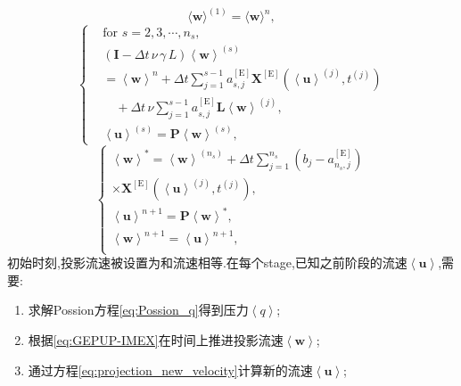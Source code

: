 \documentclass[12pt,halfline,a4paper]{ouparticle}
\begin{document}
\begin{equation}
    \langle\boldsymbol{w} \rangle^{\left( 1 \right)}=\langle\boldsymbol{w} \rangle^{n},   
\end{equation}
\begin{equation}\label{eq:GEPUP-IMEX}
\left\{
\begin{aligned}
    & \text{for } s = 2, 3, \cdots, n_s, \\
    & \left( \boldsymbol{I} - \Delta t \, \nu \, \gamma \, L \right) \left< \boldsymbol{w} \right>^{(s)} \\
    & = \left< \boldsymbol{w} \right>^{n} + \Delta t \sum_{j=1}^{s-1} a_{s,j}^{\left[ \mathrm{E} \right]} \boldsymbol{X}^{\left[ \mathrm{E} \right]} \left( \left< \boldsymbol{u} \right>^{(j)}, t^{(j)} \right) \\
    & \quad + \Delta t \, \nu \sum_{j=1}^{s-1} a_{s,j}^{\left[ \mathrm{E} \right]} \boldsymbol{L} \left< \boldsymbol{w} \right>^{(j)}, \\
    & \left< \boldsymbol{u} \right>^{(s)} = \boldsymbol{P} \left< \boldsymbol{w} \right>^{(s)},
\end{aligned}
\right.
\end{equation}
\begin{equation}
\left\{\begin{array} {l} {{{\left< \boldsymbol{w} \right>^{*}=\left< \boldsymbol{w} \right>^{\left( n_{s} \right)}+\Delta t \sum_{j=1}^{n_{s}} \left( b_{j}-a_{n_{s}, j}^{\left[ \mathrm{E} \right]} \right)}}} \\ {{{\times\boldsymbol{X}^{\left[ \mathrm{E} \right]} \left( \left< \boldsymbol{u} \right>^{\left( j \right)}, t^{\left( j \right)} \right),}}} \\ {{{\left< \boldsymbol{u} \right>^{n+1}=\boldsymbol{P} \left< \boldsymbol{w} \right>^{*},}}} \\ {{{\left< \boldsymbol{w} \right>^{n+1}=\left< \boldsymbol{u} \right>^{n+1},}}} \\ \end{array} \right. 
\end{equation}
初始时刻,投影流速被设置为和流速相等.在每个stage,已知之前阶段的流速$\left< \boldsymbol{u} \right>$,需要:
\begin{enumerate}
    \item 求解Possion方程\eqref{eq:Possion_q}得到压力$\left< q \right>$;
    \item 根据\eqref{eq:GEPUP-IMEX}在时间上推进投影流速$\left< \boldsymbol{w} \right>$;
    \item 通过方程\eqref{eq:projection_new_velocity}计算新的流速$\left< \boldsymbol{u} \right>$;
\end{enumerate}
\end{document}
